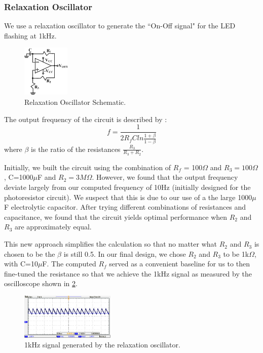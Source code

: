 \documentclass[twocolumn]{article}
\begin{document}
\subsubsection{Relaxation Oscillator}
We use a relaxation oscillator to generate the ``On-Off signal" for the LED flashing at 1kHz.
\begin{figure}[h!]
 \centering
 \includegraphics[width=0.2\textwidth]{figure/relax_osc.png}
\caption{Relaxation Oscillator Schematic.}
\label{relax_osc}
\end{figure}
The output frequency of the circuit is described by :
\begin{equation}
f=\frac{1}{2 R_f C ln\frac{1+\beta}{1-\beta}}
\end{equation}
where $\beta$ is the ratio of the resistances $\frac{R_3}{R_3+R_2}$.
\par Initially, we built the circuit using the combination of $R_f$ = 100$\Omega$ and $R_3 = 100\Omega$, C=1000$\mu$F and $R_2 = 3 M\Omega$. However, we found that the output frequency deviate largely from our computed frequency of 10Hz (initially designed for the photoresistor circuit). We suspect that this is due to our use of a the large 1000$\mu$F electrolytic capacitor. After trying different combinations of resistances and capacitance, we found that the circuit yields optimal performance when $R_2$ and $R_3$ are approximately equal. %
\par This new approach simplifies the calculation so that no matter what $R_2$ and $R_3$ is chosen to be the $\beta$ is still 0.5. In our final design, we chose $R_2$ and $R_3$ to be 1k$\Omega$, with C=10$\mu$F. The computed $R_f$ served as a convenient baseline for us to then fine-tuned the resistance so that we achieve the 1kHz signal as measured by the oscilloscope shown in \ref{relax_osc_b4boost}.
\begin{figure}[h!]
 \centering
 \includegraphics[width=0.4\textwidth]{figure/relax_osc_beforeboost.png}
\caption{1kHz signal generated by the relaxation oscillator.}
\label{relax_osc_b4boost}
\end{figure}
\end{document}
